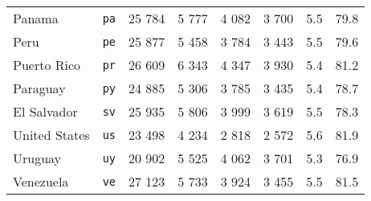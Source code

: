 \begin{tabular}{l c c c c c c c }
    Panama & \texttt{pa} & 25 784 & 5 777 & 4 082 & 3 700 & 5.5 & 79.8 \\
    Peru & \texttt{pe} & 25 877 & 5 458 & 3 784 & 3 443 & 5.5 & 79.6 \\
    Puerto Rico & \texttt{pr} & 26 609 & 6 343 & 4 347 & 3 930 & 5.4 & 81.2 \\
    Paraguay & \texttt{py} & 24 885 & 5 306 & 3 785 & 3 435 & 5.4 & 78.7 \\
    El Salvador & \texttt{sv} & 25 935 & 5 806 & 3 999 & 3 619 & 5.5 & 78.3 \\
    United States & \texttt{us} & 23 498 & 4 234 & 2 818 & 2 572 & 5.6 & 81.9 \\
    Uruguay & \texttt{uy} & 20 902 & 5 525 & 4 062 & 3 701 & 5.3 & 76.9 \\
    Venezuela & \texttt{ve} & 27 123 & 5 733 & 3 924 & 3 455 & 5.5 & 81.5 \\
    \bottomrule
\end{tabular}
